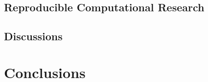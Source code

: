 \documentclass[a4paper, oneside, british, intoc, bibliograph=totoc, index=totoc, BCOR10mm, twoside, openright]{book}
\numberwithin{equation}{section}
\numberwithin{figure}{section}
\begin{document}
\section{Reproducible Computational Research} \label{sec:integrhorr}

\section{Discussions} \label{sec:integrhofuture}


%
%
%
%
%
%

%

\chapter{Conclusions}

\end{document}
